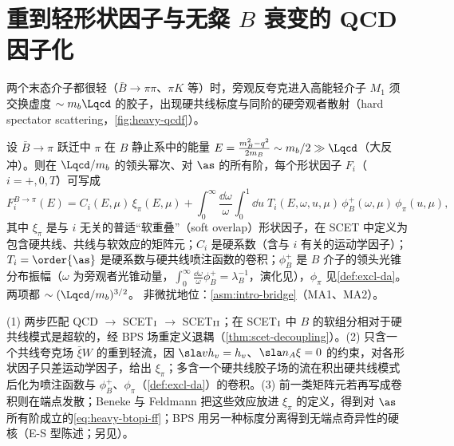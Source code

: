 \section{重到轻形状因子与无粲 $B$ 衰变的 QCD 因子化}\label{sec:heavy-qcdf}


两个末态介子都很轻（$\bar B\to\pi\pi$、$\pi K$ 等）时，旁观反夸克进入高能轻介子 $M_1$ 须交换虚度 $\sim m_b\Lqcd$ 的胶子，出现硬共线标度与同阶的硬旁观者散射（hard spectator scattering，\cref{fig:heavy-qcdf}）。

\begin{proposition}\label{prop:heavy-btopi-ff}
设 $\bar B\to\pi$ 跃迁中 $\pi$ 在 $B$ 静止系中的能量 $E=\frac{m_B^2-q^2}{2m_B}\sim m_b/2\gg\Lqcd$（大反冲）。则在 $\Lqcd/m_b$ 的领头幂次、对 $\as$ 的所有阶，每个形状因子 $F_i$（$i=+,0,T$）可写成
\begin{equation}\label{eq:heavy-btopi-ff}
F_i^{B\to\pi}(E)=C_i(E,\mu)\,\xi_\pi(E,\mu)+\int_0^\infty\frac{\dd\omega}{\omega}\int_0^1\dd u\;T_i(E,\omega,u,\mu)\,\phi_B^+(\omega,\mu)\,\phi_\pi(u,\mu),
\end{equation}
其中 $\xi_\pi$ 是与 $i$ 无关的普适“软重叠”（soft overlap）形状因子，在 SCET 中定义为包含硬共线、共线与软效应的矩阵元；$C_i$ 是硬系数（含与 $i$ 有关的运动学因子）；$T_i=\order{\as}$ 是硬系数与硬共线喷注函数的卷积；$\phi_B^+$ 是 $B$ 介子的领头光锥分布振幅（$\omega$ 为旁观者光锥动量，$\int_0^\infty\frac{\dd\omega}{\omega}\phi_B^+=\lambda_B^{-1}$\cite{Grozin:1996pq}，演化见\cite{Lange:2003ff}），$\phi_\pi$ 见\cref{def:excl-da}。两项都 $\sim(\Lqcd/m_b)^{3/2}$。
非微扰地位：\cref{asm:intro-bridge}（MA1、MA2）。
\end{proposition}

\begin{proofsketch}
(1) 两步匹配 QCD $\to$ SCET$_{\rm I}$ $\to$ SCET$_{\rm II}$；在 SCET$_{\rm I}$ 中 $B$ 的软组分相对于硬共线模式是超软的，经 BPS 场重定义退耦（\cref{thm:scet-decoupling}）。(2) 只含一个共线夸克场 $\bar\xi W$ 的重到轻流，因 $\sla vh_v=h_v$、$\sla n_A\xi=0$ 的约束，对各形状因子只差运动学因子，给出 $\xi_\pi$；多含一个硬共线胶子场的流在积出硬共线模式后化为喷注函数与 $\phi_B^+$、$\phi_\pi$（\cref{def:excl-da}）的卷积。(3) 前一类矩阵元若再写成卷积则在端点发散；Beneke 与 Feldmann 把这些效应放进 $\xi_\pi$ 的定义，得到对 $\as$ 所有阶成立的\cref{eq:heavy-btopi-ff}\cite{Beneke:2003pa}；BPS 用另一种标度分离得到无端点奇异性的硬核\cite{Bauer:2002aj}（E-S 型陈述；另见\cite{Hill:2002vw,Beneke:2005gs}）。
\end{proofsketch}

